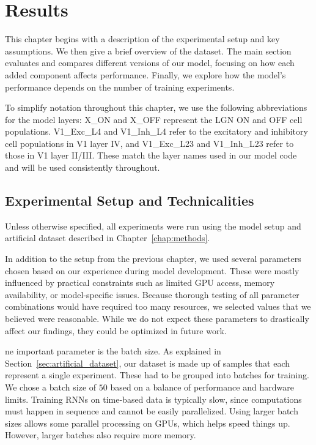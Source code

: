 \chapter{Results}
\label{chap:results}

This chapter begins with a description of the experimental setup and key assumptions. We then give a brief overview of the dataset. The main section evaluates and compares different versions of our model, focusing on how each added component affects performance. Finally, we explore how the model's performance depends on the number of training experiments.

To simplify notation throughout this chapter, we use the following abbreviations for the model layers: X\_ON and X\_OFF represent the LGN ON and OFF cell populations. V1\_Exc\_L4 and V1\_Inh\_L4 refer to the excitatory and inhibitory cell populations in V1 layer IV, and V1\_Exc\_L23 and V1\_Inh\_L23 refer to those in V1 layer II/III. These match the layer names used in our model code and will be used consistently throughout.

\section{Experimental Setup and Technicalities}
\label{sec:experimental_setup}

Unless otherwise specified, all experiments were run using the model setup and artificial dataset described in Chapter~\ref{chap:methods}.

In addition to the setup from the previous chapter, we used several parameters chosen based on our experience during model development. These were mostly influenced by practical constraints such as limited GPU access, memory availability, or model-specific issues. Because thorough testing of all parameter combinations would have required too many resources, we selected values that we believed were reasonable. While we do not expect these parameters to drastically affect our findings, they could be optimized in future work.

ne important parameter is the batch size. As explained in Section~\ref{sec:artificial_dataset}, our dataset is made up of samples that each represent a single experiment. These had to be grouped into batches for training. We chose a batch size of $50$ based on a balance of performance and hardware limits. Training RNNs on time-based data is typically slow, since computations must happen in sequence and cannot be easily parallelized. Using larger batch sizes allows some parallel processing on GPUs, which helps speed things up. However, larger batches also require more memory.

